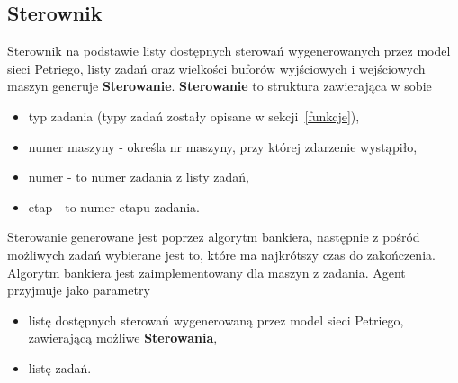 \documentclass[10pt, a4paper]{article}
\begin{document}
\subsection{Sterownik}
Sterownik na podstawie listy dostępnych sterowań wygenerowanych przez model sieci Petriego, listy zadań oraz wielkości buforów wyjściowych i wejściowych maszyn generuje \textbf{Sterowanie}. \textbf{Sterowanie} to struktura zawierająca w sobie
\begin{itemize}
\item typ zadania (typy zadań zostały opisane w sekcji~\ref{funkcje}),
\item numer maszyny - określa nr maszyny, przy której zdarzenie wystąpiło,
\item numer - to numer zadania z listy zadań,
\item etap - to numer etapu zadania.
\end{itemize}
Sterowanie generowane jest poprzez algorytm bankiera, następnie z pośród możliwych zadań wybierane jest to, które ma najkrótszy czas do zakończenia. Algorytm bankiera jest zaimplementowany dla maszyn z zadania.  Agent przyjmuje jako parametry
\begin{itemize}
\item listę dostępnych sterowań wygenerowaną przez model sieci Petriego, zawierającą możliwe \textbf{Sterowania},
\item listę zadań.
\end{itemize}
\end{document}
